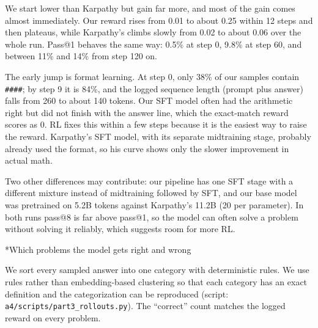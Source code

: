 \documentclass[11pt]{article}
\makeatletter
\renewcommand\subsection{\@startsection{subsection}{2}{\z@}{0.6em}{0.2em}{\normalsize\bfseries}}
\newcommand{\code}[1]{\texttt{#1}}
\makeatother
\begin{document}
We start lower than Karpathy but gain far more, and most of the gain comes almost immediately. Our reward rises from 0.01 to about 0.25 within 12 steps and then plateaus, while Karpathy's climbs slowly from 0.02 to about 0.06 over the whole run. Pass@1 behaves the same way: 0.5\% at step 0, 9.8\% at step 60, and between 11\% and 14\% from step 120 on.

The early jump is format learning. At step 0, only 38\% of our samples contain \code{\#\#\#\#}; by step 9 it is 84\%, and the logged sequence length (prompt plus answer) falls from 260 to about 140 tokens. Our SFT model often had the arithmetic right but did not finish with the answer line, which the exact-match reward scores as 0. RL fixes this within a few steps because it is the easiest way to raise the reward. Karpathy's SFT model, with its separate midtraining stage, probably already used the format, so his curve shows only the slower improvement in actual math.

Two other differences may contribute: our pipeline has one SFT stage with a different mixture instead of midtraining followed by SFT, and our base model was pretrained on 5.2B tokens against Karpathy's 11.2B (20 per parameter). In both runs pass@8 is far above pass@1, so the model can often solve a problem without solving it reliably, which suggests room for more RL.

\subsection*{Which problems the model gets right and wrong}

We sort every sampled answer into one category with deterministic rules. We use rules rather than embedding-based clustering so that each category has an exact definition and the categorization can be reproduced (script: \code{a4/scripts/part3\_rollouts.py}). The ``correct'' count matches the logged reward on every problem.
\end{document}

